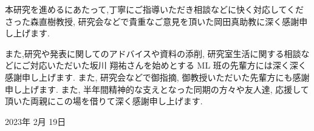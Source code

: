 \newpage
\changeindent{0cm}
\acknowledgements
\changeindent{2cm}


本研究を進めるにあたって,丁寧にご指導いただき相談などに快く対応してくださった森直樹教授, 研究会などで貴重なご意見を頂いた岡田真助教に深く感謝申し上げます.

また,研究や発表に関してのアドバイスや資料の添削, 研究室生活に関する相談などにご対応いただいた坂川 翔祐さんを始めとする ML 班の先輩方には深く深く感謝申し上げます. また, 研究会などで御指摘, 御教授いただいた先輩方にも感謝申し上げます.
また, 半年間精神的な支えとなった同期の方々や友人達, 応援して頂いた両親にこの場を借りて深く感謝申し上げます.

\begin{flushright}
  2023年  2月  19日
\end{flushright}

